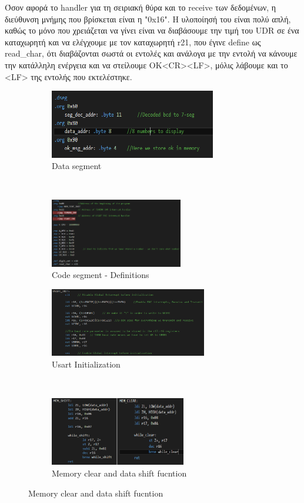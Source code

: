 \documentclass{article}
\begin{document}
	\pagebreak
	\noindent
	Όσον αφορά το handler για τη σειριακή θύρα και το receive των δεδομένων, η διεύθυνση μνήμης που βρίσκεται είναι η "0x16". Η υλοποίησή του είναι πολύ απλή, καθώς το μόνο που χρειάζεται να γίνει είναι να διαβάσουμε την τιμή του UDR σε ένα καταχωρητή και να ελέγχουμε με τον καταχωρητή r21, που έγινε define ως read\_char, ότι διαβάζονται σωστά οι εντολές και ανάλογα με την εντολή να κάνουμε την κατάλληλη ενέργεια και να στείλουμε OK<CR><LF>, μόλις λάβουμε και το <LF> της εντολής που εκτελέστηκε.
	
	
	\begin{figure}[h!]
		\centering
		\begin{subfigure}[t]{0.5\textwidth}
			\centering
			\includegraphics[height=3cm, width=\linewidth]{./results/lab3_dseg.png}
			\caption{Data segment}
		\end{subfigure}%
		~
		\begin{subfigure}[t]{0.5\textwidth}
			\centering
			\includegraphics[height=3cm, width=\linewidth]{./results/lab3_cseg.png}
			\caption{Code segment - Definitions}
		\end{subfigure}
	
		\begin{subfigure}[t]{0.5\textwidth}
			\centering
			\includegraphics[height=3cm, width=\linewidth]{./results/lab3_usart_init.png}
			\caption{Usart Initialization}
		\end{subfigure}%
		~
		\begin{subfigure}[t]{0.5\textwidth}
			\centering
			\includegraphics[height=3cm, width=\linewidth]{./results/lab3_clear_shift.png}
			\caption{Memory clear and data shift fucntion}
		\end{subfigure}	
	

\end{figure}
\end{document}
